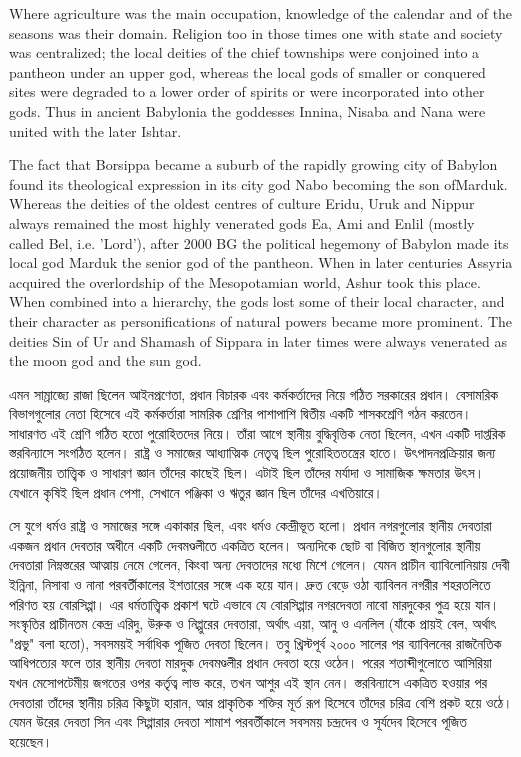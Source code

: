 Where agriculture was the main occupation, knowledge of the calendar and of the seasons was their domain. Religion too in those times one with state and society was centralized; the local deities of the chief townships were conjoined into a pantheon under an upper god, whereas the local gods of smaller or conquered sites were degraded to a lower order of spirits or were incorporated into other gods. Thus in ancient Babylonia the goddesses Innina, Nisaba and Nana were united with the later Ishtar.

The fact that Borsippa became a suburb of the rapidly growing city of Babylon found its theological expression in its city god Nabo becoming the son ofMarduk. Whereas the deities of the oldest centres of culture Eridu, Uruk and Nippur always remained the most highly venerated gods Ea, Ami and Enlil (mostly called Bel, i.e. 'Lord'), after 2000 BG the political hegemony of Babylon made its local god Marduk the senior god of the pantheon. When in later centuries Assyria acquired the overlordship of the Mesopotamian world, Ashur took this place. When combined into a hierarchy, the gods lost some of their local character, and their character as personifications of natural powers became more prominent. The deities Sin of Ur and Shamash of Sippara in later times were always venerated as the moon god and the sun god.

এমন সাম্রাজ্যে রাজা ছিলেন আইনপ্রণেতা, প্রধান বিচারক এবং কর্মকর্তাদের নিয়ে গঠিত সরকারের প্রধান। বেসামরিক বিভাগগুলোর নেতা হিসেবে এই কর্মকর্তারা সামরিক শ্রেণির পাশাপাশি দ্বিতীয় একটি শাসকশ্রেণি গঠন করতেন। সাধারণত এই শ্রেণি গঠিত হতো পুরোহিতদের নিয়ে। তাঁরা আগে স্থানীয় বুদ্ধিবৃত্তিক নেতা ছিলেন, এখন একটি দাপ্তরিক স্তরবিন্যাসে সংগঠিত হলেন। রাষ্ট্র ও সমাজের আধ্যাত্মিক নেতৃত্ব ছিল পুরোহিততন্ত্রের হাতে। উৎপাদনপ্রক্রিয়ার জন্য প্রয়োজনীয় তাত্ত্বিক ও সাধারণ জ্ঞান তাঁদের কাছেই ছিল। এটাই ছিল তাঁদের মর্যাদা ও সামাজিক ক্ষমতার উৎস। যেখানে কৃষিই ছিল প্রধান পেশা, সেখানে পঞ্জিকা ও ঋতুর জ্ঞান ছিল তাঁদের এখতিয়ারে।

সে যুগে ধর্মও রাষ্ট্র ও সমাজের সঙ্গে একাকার ছিল, এবং ধর্মও কেন্দ্রীভূত হলো। প্রধান নগরগুলোর স্থানীয় দেবতারা একজন প্রধান দেবতার অধীনে একটি দেবমণ্ডলীতে একত্রিত হলেন। অন্যদিকে ছোট বা বিজিত স্থানগুলোর স্থানীয় দেবতারা নিম্নস্তরের আত্মায় নেমে গেলেন, কিংবা অন্য দেবতাদের মধ্যে মিশে গেলেন। যেমন প্রাচীন ব্যাবিলোনিয়ায় দেবী ইন্নিনা, নিসাবা ও নানা পরবর্তীকালের ইশতারের সঙ্গে এক হয়ে যান। দ্রুত বেড়ে ওঠা ব্যাবিলন নগরীর শহরতলিতে পরিণত হয় বোরসিপ্পা। এর ধর্মতাত্ত্বিক প্রকাশ ঘটে এভাবে যে বোরসিপ্পার নগরদেবতা নাবো মারদুকের পুত্র হয়ে যান। সংস্কৃতির প্রাচীনতম কেন্দ্র এরিদু, উরুক ও নিপ্পুরের দেবতারা, অর্থাৎ এয়া, আনু ও এনলিল (যাঁকে প্রায়ই বেল, অর্থাৎ "প্রভু" বলা হতো), সবসময়ই সর্বাধিক পূজিত দেবতা ছিলেন। তবু খ্রিস্টপূর্ব ২০০০ সালের পর ব্যাবিলনের রাজনৈতিক আধিপত্যের ফলে তার স্থানীয় দেবতা মারদুক দেবমণ্ডলীর প্রধান দেবতা হয়ে ওঠেন। পরের শতাব্দীগুলোতে আসিরিয়া যখন মেসোপটেমীয় জগতের ওপর কর্তৃত্ব লাভ করে, তখন আশুর এই স্থান নেন। স্তরবিন্যাসে একত্রিত হওয়ার পর দেবতারা তাঁদের স্থানীয় চরিত্র কিছুটা হারান, আর প্রাকৃতিক শক্তির মূর্ত রূপ হিসেবে তাঁদের চরিত্র বেশি প্রকট হয়ে ওঠে। যেমন উরের দেবতা সিন এবং সিপ্পারার দেবতা শামাশ পরবর্তীকালে সবসময় চন্দ্রদেব ও সূর্যদেব হিসেবে পূজিত হয়েছেন।

